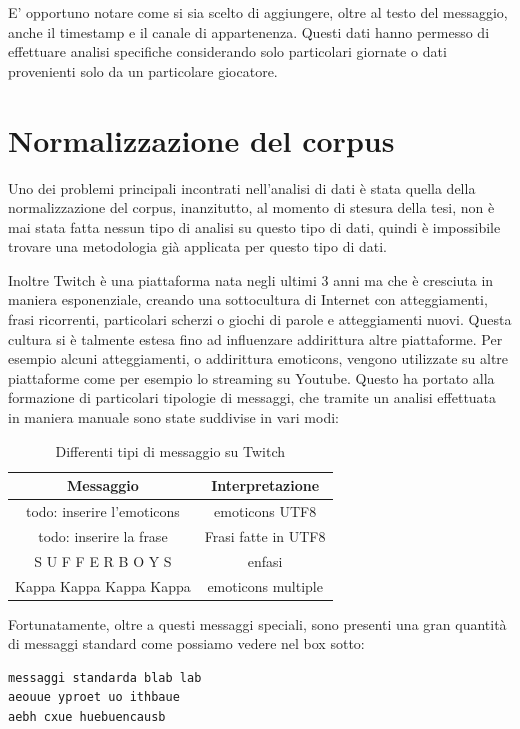 \documentclass[a4paper,12pt,openright,twoside]{report}
\theoremstyle{definition}
\begin{document}
E' opportuno notare come si sia scelto di aggiungere, oltre al testo del messaggio, anche il timestamp e il canale di appartenenza. Questi dati hanno permesso di effettuare analisi
specifiche considerando solo particolari giornate o dati provenienti solo da un particolare giocatore.

\section{Normalizzazione del corpus}
Uno dei problemi principali incontrati nell'analisi di dati è stata quella della normalizzazione del corpus,
inanzitutto, al momento di stesura della tesi, non è mai stata fatta nessun
tipo di analisi su questo tipo di dati, quindi
è impossibile trovare una metodologia già applicata per questo tipo di dati.

Inoltre Twitch è una piattaforma nata negli ultimi 3 anni ma che è cresciuta in maniera esponenziale,
creando una sottocultura di Internet con atteggiamenti, frasi ricorrenti, particolari scherzi
o giochi di parole e atteggiamenti nuovi.
Questa cultura si è talmente estesa fino ad influenzare addirittura altre piattaforme.
Per esempio alcuni atteggiamenti, o addirittura emoticons, vengono utilizzate su altre 
piattaforme come per esempio lo streaming su Youtube.
Questo ha portato alla formazione di particolari tipologie di messaggi, che tramite un analisi effettuata in maniera manuale sono state suddivise in vari modi:

\begin{table}
	\centering
	\begin{tabular}{|c|c|}
		\hline
		Messaggio & Interpretazione \\
		\hline
		\hline
		todo: inserire l'emoticons & emoticons UTF8 \\
		\hline
		todo: inserire la frase  & Frasi fatte in UTF8 \\
		\hline
		S U F F E R B O Y S & enfasi \\
		\hline
		Kappa Kappa Kappa Kappa & emoticons multiple \\
		\hline
	\end{tabular}
	\caption{Differenti tipi di messaggio su Twitch}
	\label{tab:messaggiTwitch}
\end{table}

Fortunatamente, oltre a questi messaggi speciali, sono presenti una gran quantità di messaggi standard come possiamo vedere nel box sotto:
\begin{verbatim}
messaggi standarda blab lab
aeouue yproet uo ithbaue 
aebh cxue huebuencausb 
\end{verbatim}
\end{document}
